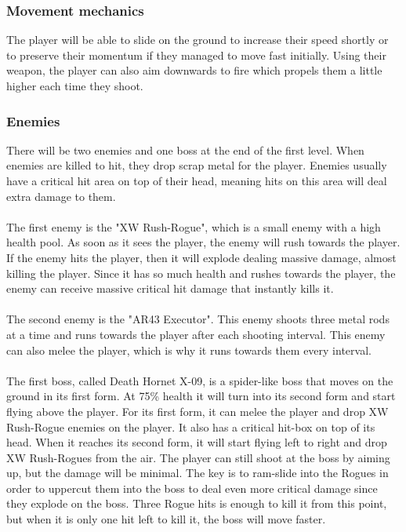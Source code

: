 \documentclass[../Main.tex]{subfiles}
\begin{document}
\subsubsection{Movement mechanics}

The player will be able to slide on the ground to increase their speed shortly or to preserve their momentum if they managed to move fast initially. Using their weapon, the player can also aim downwards to fire which propels them a little higher each time they shoot.

\subsubsection{Enemies}

 There will be two enemies and one boss at the end of the first level. When enemies are killed to hit, they drop scrap metal for the player. Enemies usually have a critical hit area on top of their head, meaning hits on this area will deal extra damage to them. 

\paragraph{}
The first enemy is the "XW Rush-Rogue", which is a small enemy with a high health pool. As soon as it sees the player, the enemy will rush towards the player. If the enemy hits the player, then it will explode dealing massive damage, almost killing the player. Since it has so much health and rushes towards the player, the enemy can receive massive critical hit damage that instantly kills it.

\paragraph{}
The second enemy is the "AR43 Executor". This enemy shoots three metal rods at a time and runs towards the player after each shooting interval. This enemy can also melee the player, which is why it runs towards them every interval.

\paragraph{}

The first boss, called Death Hornet X-09, is a spider-like boss that moves on the ground in its first form. At 75\% health it will turn into its second form and start flying above the player. For its first form, it can melee the player and drop XW Rush-Rogue enemies on the player. It also has a critical hit-box on top of its head. When it reaches its second form, it will start flying left to right and drop XW Rush-Rogues from the air. The player can still shoot at the boss by aiming up, but the damage will be minimal. The key is to ram-slide into the Rogues in order to uppercut them into the boss to deal even more critical damage since they explode on the boss. Three Rogue hits is enough to kill it from this point, but when it is only one hit left to kill it, the boss will move faster. 
\end{document}
